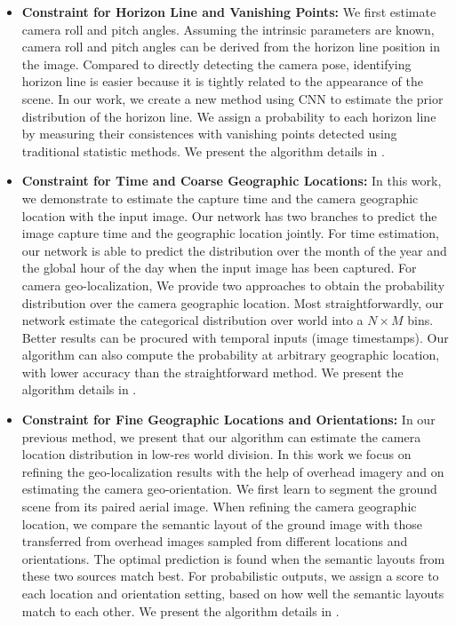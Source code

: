 \begin{itemize}[noitemsep]
  \item \textbf{Constraint for Horizon Line and Vanishing Points:}
  We first estimate camera roll and pitch angles. Assuming the intrinsic
  parameters are known, camera roll and pitch angles can be
  derived from the horizon line position in the image. Compared to
  directly detecting the camera pose, identifying horizon line is easier
  because it is tightly related to the appearance
  of the scene. In our work, we create a new method using CNN to
  estimate the prior distribution of the horizon line. We assign
  a probability to each horizon line by measuring their consistences
  with vanishing points detected using traditional statistic methods.
  We present the algorithm details in .
  \newline

  \item \textbf{Constraint for Time and Coarse Geographic Locations:}
  In this work, we demonstrate to estimate the capture time and the
  camera geographic location with the input image.
  Our network has two branches to predict the image capture time and
  the geographic location jointly.
  For time estimation, our network is able to predict the
  distribution over the month of the year and the global hour of the
  day when the input image has been captured.
  For camera geo-localization, We provide two approaches to obtain the
  probability distribution over the camera geographic location. Most
  straightforwardly, our network estimate the categorical distribution
  over world into a $N \times M$ bins. Better results can be procured
  with temporal inputs (image timestamps).  Our algorithm can also
  compute the probability at arbitrary geographic location, with lower
  accuracy than the straightforward method.
  We present the algorithm details in .
  \newline

  \item \textbf{Constraint for Fine Geographic Locations and Orientations:}
  In our previous method, we present that our algorithm can estimate
  the camera location distribution in low-res world division. In this
  work we focus on refining the geo-localization results with the help
  of overhead imagery and on estimating the camera geo-orientation. 
  We first learn to segment the ground scene from its paired aerial image.
  When refining the camera geographic location, we compare the
  semantic layout of the ground image with those transferred from
  overhead images sampled from different locations and orientations. The
  optimal prediction is found when the semantic layouts from these
  two sources match best. For probabilistic outputs, we assign
  a score to each location and orientation setting,
  based on how well the semantic layouts match to each other.
  We present the algorithm details in .
  \newline

\end{itemize}


